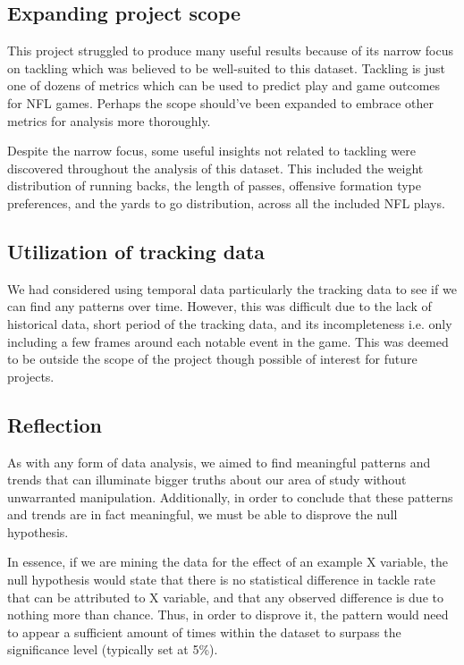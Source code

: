 \documentclass[bibtex, sigconf, hyperref={colorlinks=true,linkcolor=blue,urlcolor=blue}]{acmart}
\begin{document}
\subsection{Expanding project scope}

This project struggled to produce many useful results because of its narrow
focus on tackling which was believed to be well-suited to this dataset. Tackling
is just one of dozens of metrics which can be used to predict play and game
outcomes for NFL games. Perhaps the scope should've been expanded to embrace
other metrics for analysis more thoroughly.

Despite the narrow focus, some useful insights not related to tackling were
discovered throughout the analysis of this dataset. This included the weight
distribution of running backs, the length of passes, offensive formation type
preferences, and the yards to go distribution, across all the included NFL
plays.

\subsection{Utilization of tracking data}

We had considered using temporal data particularly the tracking data to see if
we can find any patterns over time. However, this was difficult due to the
lack of historical data, short period of the tracking data, and its
incompleteness i.e. only including a few frames around each notable event in the
game. This was deemed to be outside the scope of the project though possible of
interest for future projects.

\subsection{Reflection}

As with any form of data analysis, we aimed to find meaningful patterns and
trends that can illuminate bigger truths about our area of study without
unwarranted manipulation. Additionally, in order to conclude that these patterns
and trends are in fact meaningful, we must be able to disprove the null
hypothesis.

In essence, if we are mining the data for the effect of an example X variable,
the null hypothesis would state that there is no statistical difference in
tackle rate that can be attributed to X variable, and that any observed
difference is due to nothing more than chance. Thus, in order to disprove it,
the pattern would need to appear a sufficient amount of times within the dataset
to surpass the significance level (typically set at 5\%).
\end{document}
